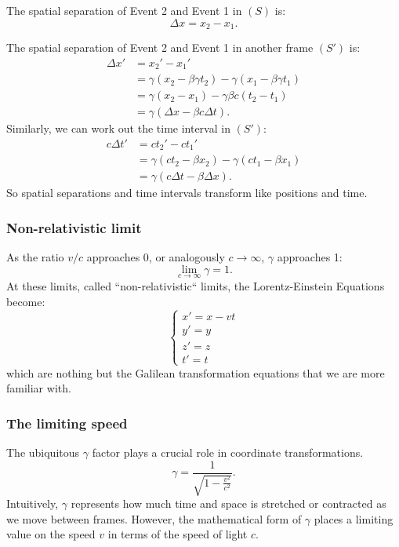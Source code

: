 \documentclass[a4paper,11pt]{article}
\numberwithin{equation}{section}
\begin{document}
 \noindent The spatial separation of Event 2 and Event 1 in $(S)$ is:
 \begin{equation}
 \Delta x = x_2 - x_1.
 \end{equation} 
 
 \noindent The spatial separation of Event 2 and Event 1 in another frame $(S')$ is:
 \begin{equation}
 \begin{split}
 \Delta x' &= x_2' - x_1'\\
 &= \gamma(x_2-\beta\gamma t_2) - \gamma(x_1-\beta\gamma t_1)\\
 &= \gamma(x_2-x_1)-\gamma\beta c(t_2-t_1)\\
 &= \gamma(\Delta x - \beta c\Delta t).
 \end{split}
 \end{equation}
 Similarly, we can work out the time interval in $(S')$: 
 \begin{equation}
 \begin{split}
 c\Delta t' &= ct_2'-ct_1'\\
 &= \gamma(ct_2-\beta x_2) - \gamma(ct_1-\beta x_1)\\
 &= \gamma(c\Delta t - \beta\Delta x).
 \end{split}
 \end{equation}
 So spatial separations and time intervals transform like positions and time. 
 
 \subsubsection{Non-relativistic limit}
 As the ratio $v/c$ approaches 0, or analogously $c \rightarrow \infty$, $\gamma$ approaches 1:
 \begin{equation}
 \lim\limits_{c\rightarrow \infty} \gamma = 1.
 \end{equation} 
 At these limits, called ``non-relativistic`` limits, the Lorentz-Einstein Equations become:
 \begin{equation}
 \begin{cases}
 x'=x-vt\\
 y'=y\\
 z'=z\\
 t'=t
 \end{cases}
 \end{equation}
 which are nothing but the Galilean transformation equations that we are more familiar with. 
 \subsubsection{The limiting speed}
 The ubiquitous $\gamma$ factor plays a crucial role in coordinate transformations. 
 $$\gamma = \frac{1}{\sqrt{1-\frac{v^2}{c^2}}}.$$
 Intuitively, $\gamma$ represents how much time and space is stretched or contracted as we move between frames. However, the mathematical form of $\gamma$ places a limiting value on the speed $v$ in terms of the speed of light $c$.
 
\end{document}

